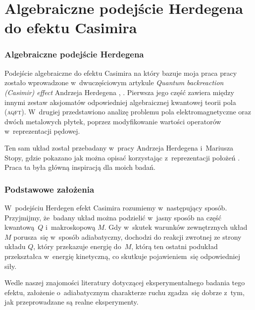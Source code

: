 \documentclass[10pt,t]{beamer}
\begin{document}
\section{Algebraiczne podejście Herdegena do efektu Casimira}



\begin{frame}
  \frametitle{Algebraiczne podejście Herdegena}


  Podejście algebraiczne do efektu Casimira na który bazuje moja praca
  pracy zostało wprowadzone w~dwuczęściowym artykule
  \textit{Quantum backreaction (Casimir) effect} Andrzeja Herdegena
  \parencite{Herdegen-Quantum-backreaction-ETC-Part-I-Pub-2005},
  \parencite{Herdegen-Quantum-backreaction-ETC-Part-II-Pub-2006}.
  Pierwsza jego część zawiera między innymi zestaw aksjomatów odpowiedniej
  algebraicznej kwantowej teorii pola (\textsc{aqft}). W~drugiej
  przedstawiono analizę problemu pola elektromagnetyczne oraz
  dwóch metalowych płytek, poprzez modyfikowanie wartości operatorów
  w~reprezentacji pędowej.

  Ten sam układ został przebadany w~pracy Andrzeja Herdegena i~Mariusza
  Stopy, gdzie pokazano jak można opisać korzystając z~reprezentacji
  położeń \parencite{Herdegen-Stopa-Global-vs-local-ETC-2010}. Praca ta była
  główną inspiracją dla moich badań.

\end{frame}





\begin{frame}
  \frametitle{Podstawowe założenia}


  W~podejściu Herdegen efekt Casimira rozumiemy w~następujący sposób.
  Przyjmijmy, że~badany układ można podzielić w~jasny sposób na część
  kwantową~$Q$ i~makroskopową $M$. Gdy w~skutek warunków zewnętrznych układ
  $M$ porusza~się w~sposób adiabatyczny, dochodzi do reakcji zwrotnej ze
  strony układu $Q$, który przekazuje energię do~$M$, którą ten ostatni
  podukład przekształca w~energię kinetyczną, co skutkuje pojawieniem~się
  odpowiedniej siły.

  Wedle naszej znajomości literatury dotyczącej eksperymentalnego badania
  tego efektu, założenie o~adiabatycznym charakterze ruchu zgadza~się
  dobrze z~tym, jak przeprowadzane są realne eksperymenty.

\end{frame}
\end{document}
